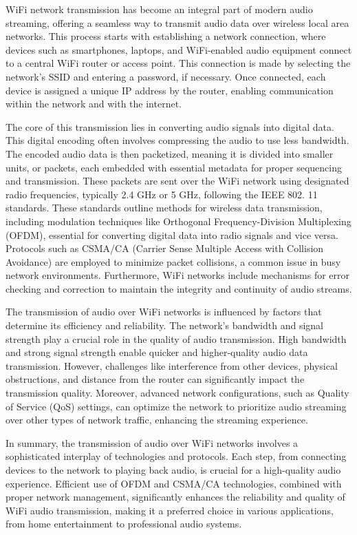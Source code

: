 \documentclass[conference]{IEEEtran}
\begin{document}
WiFi network transmission has become an integral part of modern audio streaming, offering a
seamless way to transmit audio data over wireless local area networks. This process starts with
establishing a network connection, where devices such as smartphones, laptops, and WiFi-enabled
audio equipment connect to a central WiFi router or access point. This connection is made by
selecting the network's SSID and entering a password, if necessary. Once connected, each device
is assigned a unique IP address by the router, enabling communication within the network and
with the internet.

The core of this transmission lies in converting audio signals into digital data. This digital
encoding often involves compressing the audio to use less bandwidth. The encoded audio data is
then packetized, meaning it is divided into smaller units, or packets, each embedded with
essential metadata for proper sequencing and transmission. These packets are sent over the WiFi
network using designated radio frequencies, typically 2.4 GHz or 5 GHz, following the IEEE 802.
11 standards. These standards outline methods for wireless data transmission, including
modulation techniques like Orthogonal Frequency-Division Multiplexing (OFDM), essential for
converting digital data into radio signals and vice versa. Protocols such as CSMA/CA (Carrier
Sense Multiple Access with Collision Avoidance) are employed to minimize packet collisions, a
common issue in busy network environments. Furthermore, WiFi networks include mechanisms for
error checking and correction to maintain the integrity and continuity of audio streams. \cite{ISCE_2014_Kim-et-al}

The transmission of audio over WiFi networks is influenced by factors that determine its
efficiency and reliability. The network's bandwidth and signal strength play a crucial role in
the quality of audio transmission. High bandwidth and strong signal strength enable quicker and
higher-quality audio data transmission. However, challenges like interference from other
devices, physical obstructions, and distance from the router can significantly impact the
transmission quality. Moreover, advanced network configurations, such as Quality of Service
(QoS) settings, can optimize the network to prioritize audio streaming over other types of
network traffic, enhancing the streaming experience.

In summary, the transmission of audio over WiFi networks involves a sophisticated interplay of technologies and protocols. Each step, from connecting devices to the network to playing back audio, is crucial for a high-quality audio experience. Efficient use of OFDM and CSMA/CA technologies, combined with proper network management, significantly enhances the reliability and quality of WiFi audio transmission, making it a preferred choice in various applications, from home entertainment to professional audio systems.
\end{document}
